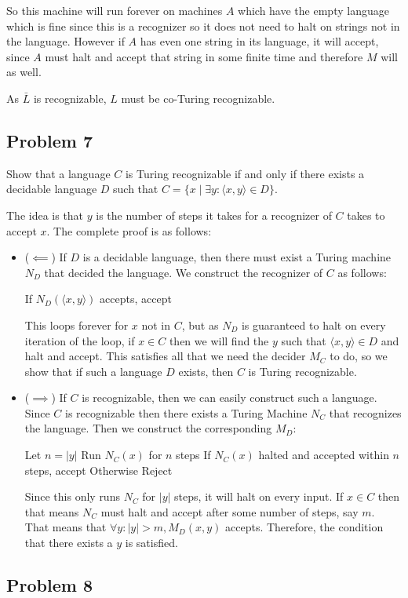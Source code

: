 \documentclass[english]{article}
\begin{document}
So this machine will run forever on machines $A$ which have the empty language
which is fine since this is a recognizer so it does not need to halt on 
strings not in the language. However if $A$ has even one string in its
language, it will accept, since $A$ must halt and accept that string in some
finite time and therefore $M$ will as well.

As $\bar{L}$ is recognizable, $L$ must be co-Turing recognizable. 

\subsection*{Problem 7}
Show that a language $C$ is Turing recognizable if and only if there exists a 
decidable language $D$ such that
$C = \{ x \mid \exists y : \langle x, y \rangle \in D\}$.

The idea is that $y$ is the number of steps it takes for a recognizer of $C$
takes to accept $x$. The complete proof is as follows:
\begin{itemize}
\item ($ \impliedby $) If $D$ is a decidable language, then there must exist
	a Turing machine $N_D$ that decided the language. We construct the
	recognizer of $C$ as follows:
\begin{algorithmic}
		\State If $N_D(\langle x, y \rangle)$ accepts, accept 
	\EndFor 
\EndFunction
\end{algorithmic}

This loops forever for $x$ not in $C$, but as $N_D$ is guaranteed to halt
on every iteration of the loop, if $x \in C$ then we will find the $y$
such that $\langle x,y \rangle \in D$ and halt and accept. This satisfies
all that we need the decider $M_C$ to do, so we show that if such a
language $D$ exists, then $C$ is Turing recognizable.

\item ($ \implies $) If $C$ is recognizable, then we can easily construct
	such a language. Since $C$ is recognizable then there exists a
	Turing Machine $N_C$ that recognizes the language. Then we construct
	the corresponding $M_D$:
\begin{algorithmic}
	\State Let $n = |y|$
	\State Run $N_C(x)$ for $n$ steps
	\State If $N_C(x)$ halted and accepted within $n$ steps, accept
	\State Otherwise Reject
\EndFunction
\end{algorithmic}

Since this only runs $N_C$ for $|y|$ steps, it will halt on every input. If
$x \in C$ then that means $N_C$ must halt and accept after some number of 
steps, say $m$. That means that $\forall y : |y| > m, M_D(x,y)$ accepts. 
Therefore, the condition that there exists a $y$ is satisfied.
\end{itemize}

\subsection*{Problem 8}
\end{document}
